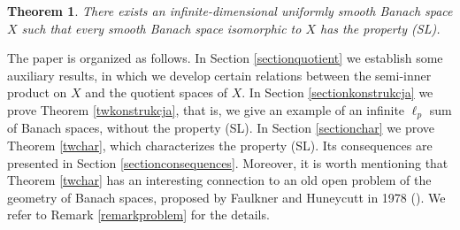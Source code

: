 \documentclass[12pt, reqno]{amsart}
\newtheorem{theorem}{Theorem}[section]
\theoremstyle{definition}
\theoremstyle{remark}
\numberwithin{equation}{section}
\begin{document}
\begin{theorem}
\label{twgm}
There exists an infinite-dimensional uniformly smooth Banach space $X$ such that every smooth Banach space isomorphic to $X$ has the property (SL).
\end{theorem}

The paper is organized as follows. In Section \ref{sectionquotient} we establish some auxiliary results, in which we develop certain relations between the semi-inner product on $X$ and the quotient spaces of $X$. In Section \ref{sectionkonstrukcja} we prove Theorem \ref{twkonstrukcja}, that is, we give an example of an infinite $\ell_p$ sum of Banach spaces, without the property (SL). In Section \ref{sectionchar} we prove Theorem \ref{twchar}, which characterizes the property (SL). Its consequences are presented in Section \ref{sectionconsequences}. Moreover, it is worth mentioning that Theorem \ref{twchar} has an interesting connection to an old open problem of the geometry of Banach spaces, proposed by Faulkner and Huneycutt in 1978 (\cite{faulkner}). We refer to Remark \ref{remarkproblem} for the details.
\end{document}
